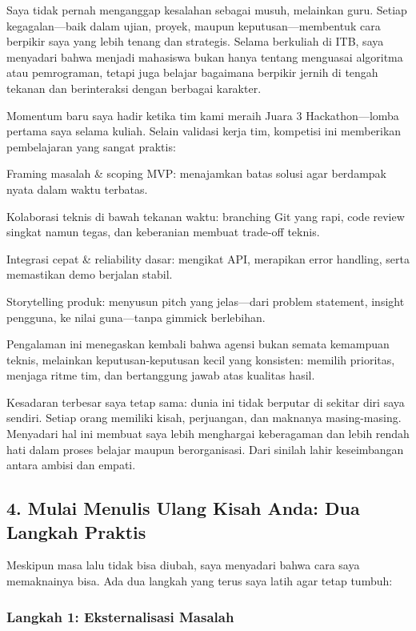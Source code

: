 \documentclass[
  letterpaper,
  DIV=11,
  numbers=noendperiod]{scrreprt}
\begin{document}
Saya tidak pernah menganggap kesalahan sebagai musuh, melainkan guru.
Setiap kegagalan---baik dalam ujian, proyek, maupun
keputusan---membentuk cara berpikir saya yang lebih tenang dan
strategis. Selama berkuliah di ITB, saya menyadari bahwa menjadi
mahasiswa bukan hanya tentang menguasai algoritma atau pemrograman,
tetapi juga belajar bagaimana berpikir jernih di tengah tekanan dan
berinteraksi dengan berbagai karakter.

Momentum baru saya hadir ketika tim kami meraih Juara 3
Hackathon---lomba pertama saya selama kuliah. Selain validasi kerja tim,
kompetisi ini memberikan pembelajaran yang sangat praktis:

Framing masalah \& scoping MVP: menajamkan batas solusi agar berdampak
nyata dalam waktu terbatas.

Kolaborasi teknis di bawah tekanan waktu: branching Git yang rapi, code
review singkat namun tegas, dan keberanian membuat trade-off teknis.

Integrasi cepat \& reliability dasar: mengikat API, merapikan error
handling, serta memastikan demo berjalan stabil.

Storytelling produk: menyusun pitch yang jelas---dari problem statement,
insight pengguna, ke nilai guna---tanpa gimmick berlebihan.

Pengalaman ini menegaskan kembali bahwa agensi bukan semata kemampuan
teknis, melainkan keputusan-keputusan kecil yang konsisten: memilih
prioritas, menjaga ritme tim, dan bertanggung jawab atas kualitas hasil.

Kesadaran terbesar saya tetap sama: dunia ini tidak berputar di sekitar
diri saya sendiri. Setiap orang memiliki kisah, perjuangan, dan maknanya
masing-masing. Menyadari hal ini membuat saya lebih menghargai
keberagaman dan lebih rendah hati dalam proses belajar maupun
berorganisasi. Dari sinilah lahir keseimbangan antara ambisi dan empati.

\subsection{\texorpdfstring{\textbf{4. Mulai Menulis Ulang Kisah Anda:
Dua Langkah
Praktis}}{4. Mulai Menulis Ulang Kisah Anda: Dua Langkah Praktis}}\label{mulai-menulis-ulang-kisah-anda-dua-langkah-praktis}

Meskipun masa lalu tidak bisa diubah, saya menyadari bahwa cara saya
memaknainya bisa. Ada dua langkah yang terus saya latih agar tetap
tumbuh:

\subsubsection{Langkah 1: Eksternalisasi
Masalah}\label{langkah-1-eksternalisasi-masalah}
\end{document}
